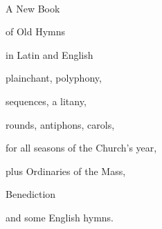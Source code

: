 






%





\nopagenumbers



\

\bigskip

\bigskip

\centerline{\Bigtype A New Book}

\bigskip

\centerline{\Bigtype of Old Hymns}

\bigskip

\bigskip

\centerline{\bigtype in Latin and English}

\bigskip




\bigskip

\centerline{plainchant, polyphony,}

\bigskip

\centerline{sequences, a litany,}

\bigskip

\centerline{rounds, antiphons, carols,}

\bigskip

\centerline{for all seasons of the Church's year,}

\bigskip

\centerline{plus Ordinaries of the Mass,}

\bigskip

\centerline{Benediction}

\bigskip

\centerline{and some English hymns.}

\vfill

